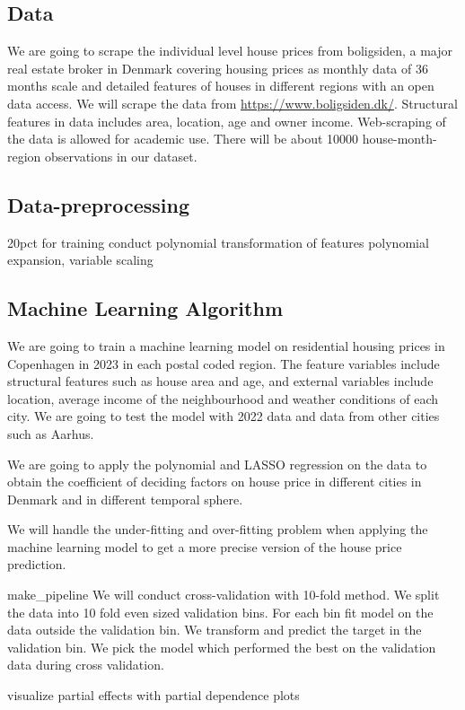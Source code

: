 \documentclass[12pt]{article} %
\begin{document}
	\subsection{Data}
			We are going to scrape the individual level house prices from boligsiden, a major real estate broker in Denmark covering housing prices as monthly data of 36 months scale and detailed features of houses in different regions with an open data access. We will scrape the data from \url{https://www.boligsiden.dk/}. Structural features in data includes area, location, age and owner income. Web-scraping of the data is allowed for academic use. There will be about 10000 house-month-region observations in our dataset. 
	\subsection{Data-preprocessing}
		20pct for training
		conduct polynomial transformation of features
		polynomial expansion, variable scaling

		

	\subsection{Machine Learning Algorithm}
		We are going to train a machine learning model on residential housing prices in Copenhagen in 2023 in each postal coded region. The feature variables include structural features such as house area and age, and external variables include location, average income of the neighbourhood and weather conditions of each city. We are going to test the model with 2022 data and data from other cities such as Aarhus.\par
		We are going to apply the polynomial and LASSO regression on the data to obtain the coefficient of deciding factors on house price in different cities in Denmark and in different temporal sphere.\par
		We will handle the under-fitting and over-fitting problem when applying the machine learning model to get a more precise version of the house price prediction.\par
		make_pipeline
		We will conduct cross-validation with 10-fold method. We split the data into 10 fold even sized validation bins. For each bin fit model on the data outside the validation bin. We transform and predict the target in the validation bin. We pick the model which performed the best on the validation data during cross validation.\par
		visualize partial effects with partial dependence plots
		
\end{document}
